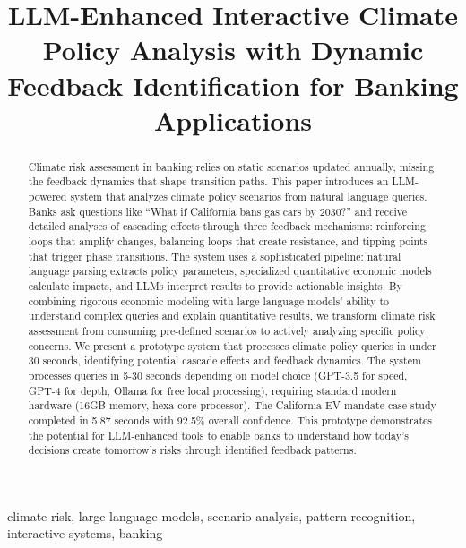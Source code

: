 \documentclass[conference]{IEEEtran}
\begin{document}
\title{LLM-Enhanced Interactive Climate Policy Analysis with Dynamic Feedback Identification for Banking Applications}

\author{
}

\maketitle

\begin{abstract}
Climate risk assessment in banking relies on static scenarios updated annually, missing the feedback dynamics that shape transition paths. This paper introduces an LLM-powered system that analyzes climate policy scenarios from natural language queries. Banks ask questions like ``What if California bans gas cars by 2030?'' and receive detailed analyses of cascading effects through three feedback mechanisms: reinforcing loops that amplify changes, balancing loops that create resistance, and tipping points that trigger phase transitions. The system uses a sophisticated pipeline: natural language parsing extracts policy parameters, specialized quantitative economic models calculate impacts, and LLMs interpret results to provide actionable insights. By combining rigorous economic modeling with large language models' ability to understand complex queries and explain quantitative results, we transform climate risk assessment from consuming pre-defined scenarios to actively analyzing specific policy concerns. We present a prototype system that processes climate policy queries in under 30 seconds, identifying potential cascade effects and feedback dynamics. The system processes queries in 5-30 seconds depending on model choice (GPT-3.5 for speed, GPT-4 for depth, Ollama for free local processing), requiring standard modern hardware (16GB memory, hexa-core processor). The California EV mandate case study completed in 5.87 seconds with 92.5\% overall confidence. This prototype demonstrates the potential for LLM-enhanced tools to enable banks to understand how today's decisions create tomorrow's risks through identified feedback patterns.
\end{abstract}

\begin{IEEEkeywords}
climate risk, large language models, scenario analysis, pattern recognition, interactive systems, banking
\end{IEEEkeywords}
\end{document}
